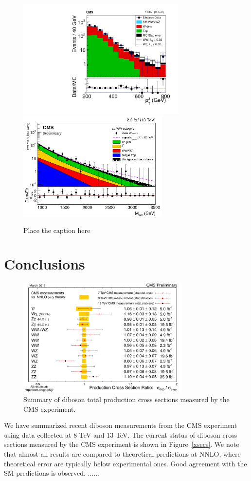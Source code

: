 \documentclass[10pt]{article}
\begin{document}
\begin{figure}[htb]
  \centering
    \includegraphics[height=2.35in]{figures/WV8TeV_ptJ_aC.png}
    \includegraphics[height=2.15in]{figures/WV13TeV_mWW_aC.png}
  \caption{ Place the caption here}
  \label{fig:wvfigs}
\end{figure}

\section{Conclusions}
\begin{figure}[htb]
  \centering
    \includegraphics[height=2.35in]{figures/CrossSectionSummary.pdf}
  \caption{ Summary of diboson total production cross sections measured by the CMS experiment. }
  \label{fig:xsecs}
\end{figure}


We have summarized recent diboson measurements from the CMS experiment using
data collected at 8 TeV and 13 TeV. The current status of diboson cross sections 
measured by the CMS experiment is shown in Figure~\ref{xsecs}. We note that 
almost all results are compared to theoretical predictions at NNLO, where theoretical 
error are typically below experimental ones. 
Good agreement with the SM predictions is
observed. 
...... \cite{CMS:2016djf} \cite{Cascioli:2014yka} 



\end{document}
